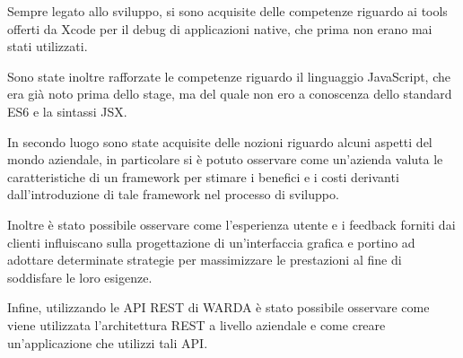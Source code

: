 Sempre legato allo sviluppo, si sono acquisite delle competenze riguardo ai tools offerti da Xcode per il debug di applicazioni native, che prima non erano mai stati utilizzati.

Sono state inoltre rafforzate le competenze riguardo il linguaggio JavaScript, che era già noto prima dello stage, ma del quale non ero a conoscenza dello standard ES6 e la sintassi JSX.

In secondo luogo sono state acquisite delle nozioni riguardo alcuni aspetti del mondo aziendale, in particolare si è potuto osservare come un'azienda valuta le caratteristiche di un framework per stimare i benefici e i costi derivanti dall'introduzione di tale framework nel processo di sviluppo.

Inoltre è stato possibile osservare come l'esperienza utente e i feedback forniti dai clienti influiscano sulla progettazione di un'interfaccia grafica e portino ad adottare determinate strategie per massimizzare le prestazioni al fine di soddisfare le loro esigenze.

Infine, utilizzando le API REST di WARDA è stato possibile osservare come viene utilizzata l'architettura REST a livello aziendale e come creare un'applicazione che utilizzi tali API.

